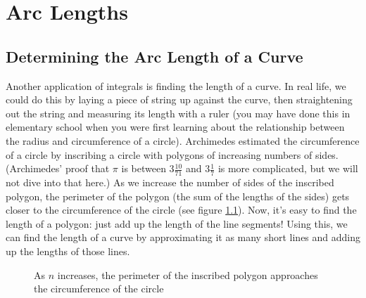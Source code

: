 \chapter{Arc Lengths}

\section{Determining the Arc Length of a Curve}

Another application of integrals is finding the length of a curve. In 
real life, we could do this by laying a piece of string up against 
the curve, then straightening out the string and measuring its length 
with a ruler (you may have done this in elementary school when you 
were first learning about the relationship between the radius and 
circumference of a circle). Archimedes estimated the circumference of 
a circle by inscribing a circle with polygons of increasing numbers 
of sides. (Archimedes' proof that $\pi$ is between $3 \frac{10}{71}$ 
and $3 \frac{1}{7}$ is more complicated, but we will not dive into that 
here.) As we increase the number of sides of the inscribed polygon, 
the perimeter of the polygon (the sum of the lengths of the sides) 
gets closer to the circumference of the circle (see figure 
\ref{fig:circles}). Now, it's easy to find the length of a polygon: 
just add up the length of the line segments! Using this, we can find 
the length of a curve by approximating it as many short lines and 
adding up the lengths of those lines. 
\begin{figure}[htbp]
\centering
    \caption{As $n$ increases, the perimeter of the inscribed polygon 
    approaches the circumference of the circle}
    \label{fig:circles}
\end{figure}


